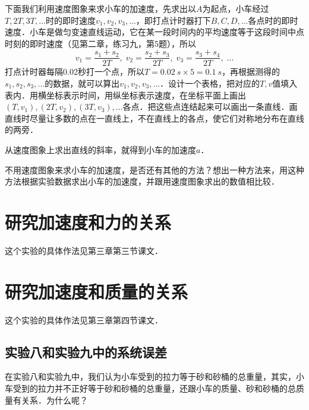 下面我们利用速度图象来求小车的加速度，先求出以$A$为起点，小车经过$T,2T,3T,\ldots$时的即时速度$v_1,v_2,v_3,\ldots$，即打点计时器打下$B,C,D,\ldots$各点时的即时速度．小车是做匀变速直线运动，它在某一段时间内的平均速度等于这段时间中点时刻的即时速度（见第二章，练习九，第5题），所以
\[v_1=\frac{s_1+s_2}{2T},\; v_2=\frac{s_2+s_3}{2T},\;v_3=\frac{s_3+s_4}{2T},\; \ldots\]
打点计时器每隔0.02秒打一个点，所以$T=\qty{0.02}{s}\times 5=\qty{0.1}{s}$，再根据测得的$s_1,s_2,s_3,\ldots$的数据，就可以算出$v_1,v_2,v_3,\ldots$．设计一个表格，把对应的$T,v$值填入表内．用横坐标表示时间，用纵坐标表示速度，在坐标平面上画出$(T,v_1),(2T,v_2),(3T,v_3),\ldots$各点．把这些点连结起来可以画出一条直线．画直线时尽量让多数的点在一直线上，不在直线上的各点，使它们对称地分布在直线的两旁．

从速度图象上求出直线的斜率，就得到小车的加速度$a$．

不用速度图象来求小车的加速度，是否还有其他的方法？想出一种方法来，用这种方法根据实验数据求出小车的加速度，并跟用速度图象求出的数值相比较．

\section{研究加速度和力的关系}
这个实验的具体作法见第三章第三节课文．

\section{研究加速度和质量的关系}
这个实验的具体作法见第三章第四节课文．

\subsection*{实验八和实验九中的系统误差}
在实验八和实验九中，我们认为小车受到的拉力等于砂和砂桶的总重量，其实，小车受到的拉力并不正好等于砂和砂桶的总重量，还跟小车的质量、砂和砂桶的总质量有关系．为什么呢？

